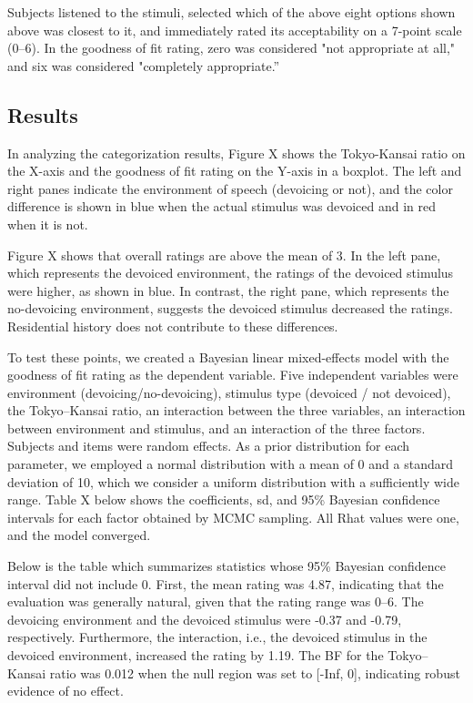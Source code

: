\documentclass[a4paper,11pt,twocolumn]{article}
\begin{document}
Subjects listened to the stimuli, selected which of the above eight options shown above was closest to it, and immediately rated its acceptability on a 7-point scale (0--6). In the goodness of fit rating, zero was considered "not appropriate at all," and six was considered "completely appropriate.”

\subsection{Results}

In analyzing the categorization results, Figure X shows the Tokyo-Kansai ratio on the X-axis and the goodness of fit rating on the Y-axis in a boxplot. The left and right panes indicate the environment of speech (devoicing or not), and the color difference is shown in blue when the actual stimulus was devoiced and in red when it is not.

Figure X shows that overall ratings are above the mean of 3. In the left pane, which represents the devoiced environment, the ratings of the devoiced stimulus were higher, as shown in blue. In contrast, the right pane, which represents the no-devoicing environment, suggests the devoiced stimulus decreased the ratings. Residential history does not contribute to these differences.

To test these points, we created a Bayesian linear mixed-effects model with the goodness of fit rating as the dependent variable. Five independent variables were environment (devoicing/no-devoicing), stimulus type (devoiced / not devoiced), the Tokyo--Kansai ratio, an interaction between the three variables, an interaction between environment and stimulus, and an interaction of the three factors. Subjects and items were random effects. As a prior distribution for each parameter, we employed a normal distribution with a mean of 0 and a standard deviation of 10, which we consider a uniform distribution with a sufficiently wide range. Table X below shows the coefficients, sd, and 95\% Bayesian confidence intervals for each factor obtained by MCMC sampling. All Rhat values were one, and the model converged.

Below is the table which summarizes statistics whose 95\% Bayesian confidence interval did not include 0. First, the mean rating was 4.87, indicating that the evaluation was generally natural, given that the rating range was 0--6. The devoicing environment and the devoiced stimulus were -0.37 and -0.79, respectively. Furthermore, the interaction, i.e., the devoiced stimulus in the devoiced environment, increased the rating by 1.19. The BF for the Tokyo--Kansai ratio was 0.012 when the null region was set to [-Inf, 0], indicating robust evidence of no effect.
\end{document}

